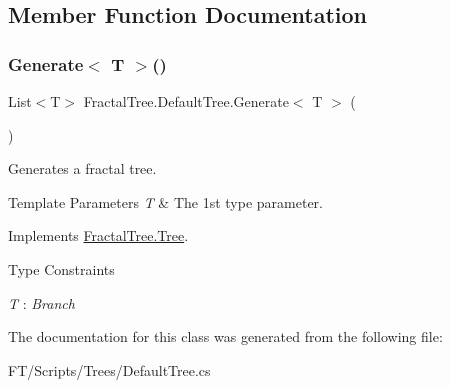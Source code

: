 \subsection{Member Function Documentation}
\mbox{\label{class_fractal_tree_1_1_default_tree_a99f8ba1f24ba5693f0981be567b236a0}} 
\subsubsection{\texorpdfstring{Generate$<$ T $>$()}{Generate< T >()}}
{\footnotesize\ttfamily List$<$T$>$ Fractal\+Tree.\+Default\+Tree.\+Generate$<$ T $>$ (\begin{DoxyParamCaption}{ }\end{DoxyParamCaption})}



Generates a fractal tree. 


\begin{DoxyTemplParams}{Template Parameters}
{\em T} & The 1st type parameter.\\
\hline
\end{DoxyTemplParams}


Implements \hyperlink{interface_fractal_tree_1_1_tree}{Fractal\+Tree.\+Tree}.

\begin{Desc}
\item[Type Constraints]\begin{description}
\item[{\em T} : {\em Branch}]\end{description}
\end{Desc}


The documentation for this class was generated from the following file\+:\begin{DoxyCompactItemize}
\item 
F\+T/\+Scripts/\+Trees/Default\+Tree.\+cs\end{DoxyCompactItemize}
